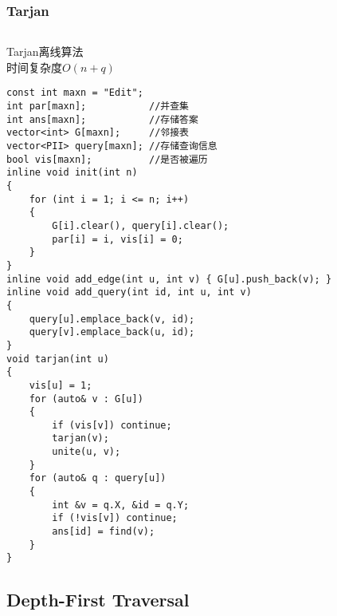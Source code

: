 \documentclass[twoside]{article}
\begin{document}
\subsubsection{Tarjan}
\begin{lstlisting}
\end{lstlisting}
Tarjan离线算法\\
时间复杂度$O(n+q)$
\begin{lstlisting}
const int maxn = "Edit";
int par[maxn];           //并查集
int ans[maxn];           //存储答案
vector<int> G[maxn];     //邻接表
vector<PII> query[maxn]; //存储查询信息
bool vis[maxn];          //是否被遍历
inline void init(int n)
{
    for (int i = 1; i <= n; i++)
    {
        G[i].clear(), query[i].clear();
        par[i] = i, vis[i] = 0;
    }
}
inline void add_edge(int u, int v) { G[u].push_back(v); }
inline void add_query(int id, int u, int v)
{
    query[u].emplace_back(v, id);
    query[v].emplace_back(u, id);
}
void tarjan(int u)
{
    vis[u] = 1;
    for (auto& v : G[u])
    {
        if (vis[v]) continue;
        tarjan(v);
        unite(u, v);
    }
    for (auto& q : query[u])
    {
        int &v = q.X, &id = q.Y;
        if (!vis[v]) continue;
        ans[id] = find(v);
    }
}
\end{lstlisting}
\subsection{Depth-First Traversal}
\end{document}
